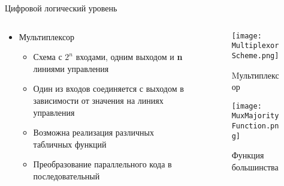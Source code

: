 \documentclass[aspectratio=169,14pt]{beamer}
\begin{document}
\begin{frame}{Цифровой логический уровень}
    \begin{columns}[T,onlytextwidth]
        \begin{column}{0.6\textwidth}
            \begin{itemize}
            \item Мультиплексор
                \begin{itemize}
                    \item Схема с $2^n$ входами, одним выходом и \textbf{n} линиями управления
                    \item Один из входов соединяется с выходом в зависимости от значения на линиях управления
                    \item Возможна реализация различных табличных функций
                    \item Преобразование параллельного кода в последовательный
                \end{itemize}
            \end{itemize}
        \end{column}
        \begin{column}{0.4\textwidth}
            \begin{figure}[htp]
                \centering
                \texttt{[image: MultiplexorScheme.png]}
                \captionsetup{skip=-5pt}
                \caption{\tiny{Mультиплексор}}
            \end{figure}
            \begin{figure}
                \centering
                \texttt{[image: MuxMajorityFunction.png]}
                \captionsetup{skip=-5pt}
                \caption{\tiny{Функция большинства}}
            \end{figure}
        \end{column}
    \end{columns}
\end{frame}
\end{document}
